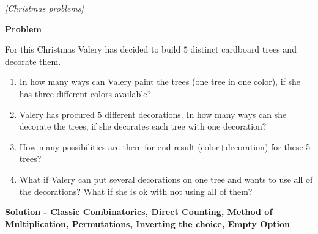 

%

\renewcommand{\theenumi}{\alph{enumi}}



\noindent 
\filbreak
\begin{problem}
\textit{[Christmas problems]}

\textbf{Problem}

For this Christmas Valery has decided to build $5$ distinct cardboard trees and decorate them.

\begin{enumerate}
\item In how many ways can Valery paint the trees (one tree in one color), if she has three different colors available? 
\item Valery has procured $5$ different decorations. In how many ways can she decorate the trees, if she decorates each tree with one decoration?
\item How many possibilities are there for end result (color+decoration) for these 5 trees?
\item What if Valery can put several decorations on one tree and wants to use all of the decorations? What if she is ok with not using all of them?
\end{enumerate}


\textbf{Solution - Classic Combinatorics, Direct Counting, Method of Multiplication, Permutations, Inverting the choice, Empty Option}


\end{problem}
